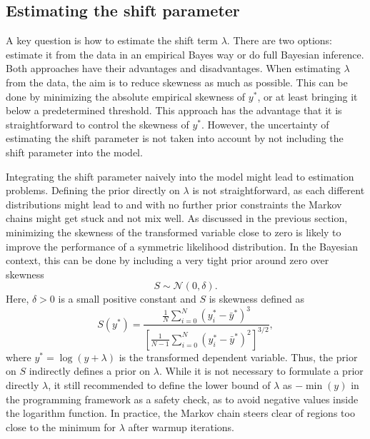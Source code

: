 \subsection{Estimating the shift parameter}
A key question is how to estimate the shift term $\lambda$.
There are two options: estimate it from the data in an empirical Bayes way or do full Bayesian inference.
Both approaches have their advantages and disadvantages.
When estimating $\lambda$ from the data, the aim is to reduce skewness as much as possible.
This can be done by minimizing the absolute empirical skewness of $y^*$, or at least bringing it below a predetermined threshold.
This approach has the advantage that it is straightforward to control the skewness of $y^*$.
However, the uncertainty of estimating the shift parameter is not taken into account by not including the shift parameter into the model.

Integrating the shift parameter naively into the model might lead to estimation problems.
Defining the prior directly on $\lambda$ is not straightforward, as each different distributions might lead to  and with no further prior constraints the Markov chains might get stuck and not mix well.
As discussed in the previous section, minimizing the skewness of the transformed variable close to zero is likely to improve the performance of a symmetric likelihood distribution.
In the Bayesian context, this can be done by including a very tight prior around zero over skewness
\begin{equation*}
    S \sim \mathcal N(0, \delta).
\end{equation*}
Here, $\delta > 0$ is a small positive constant and $S$ is skewness defined as
\begin{equation*}
    \displaystyle S(y^*) =  \frac{\frac 1 N \sum^{N}_{i = 0} (y_i^* - \bar y^* )^3}
    {\left[ \frac{1}{N - 1} \sum^{N}_{i = 0} (y_i^* - \bar y^* )^2 \right]^{3/2}},
\end{equation*}
where $y^* = \log(y + \lambda)$ is the transformed dependent variable. Thus, the prior on $S$ indirectly defines a prior on $\lambda$.
While it is not necessary to formulate a prior directly $\lambda$, it still recommended to define the lower bound of $\lambda$ as $-\min(y)$ in the programming framework as a safety check, as to avoid negative values inside the logarithm function.
In practice, the Markov chain steers clear of regions too close to the minimum for $\lambda$ after warmup iterations.

